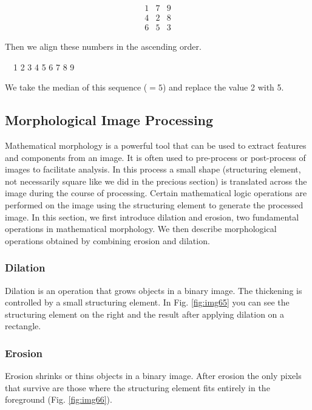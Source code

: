 \[
 \begin{matrix}
  1 & 7 & 9 \\
  4 & 2 & 8 \\
  6 & 5 & 3
 \end{matrix}
\]

Then we align these numbers in the ascending order. 

\ \ 1 2 3 4 5 6 7 8 9

We take the median of this sequence ($=5$) and replace the value 2 with
5.
\subsection{Morphological Image Processing}

Mathematical morphology is a powerful tool that can be used to extract
features and components from an image. It is often used to pre-process
or post-process of images to facilitate analysis. In this process a
small shape (structuring element, not necessarily square like we did in
the precious section) is translated across the image during the course
of processing. Certain mathematical logic operations are performed on
the image using the structuring element to generate the processed
image.
In this section, we first introduce dilation and erosion, two
fundamental operations in mathematical morphology. We then describe
morphological operations obtained by combining erosion and dilation. 
\subsubsection{Dilation}
Dilation is an operation that grows objects in a binary image. The
thickening is controlled by a small structuring element. In Fig. \ref{fig:img65} 
you can see the structuring element on the right and
the result after applying dilation on a rectangle.




\subsubsection{Erosion}
Erosion shrinks or thins objects in a binary image. After erosion the
only pixels that survive are those where the structuring element fits
entirely in the foreground (Fig. \ref{fig:img66}).

